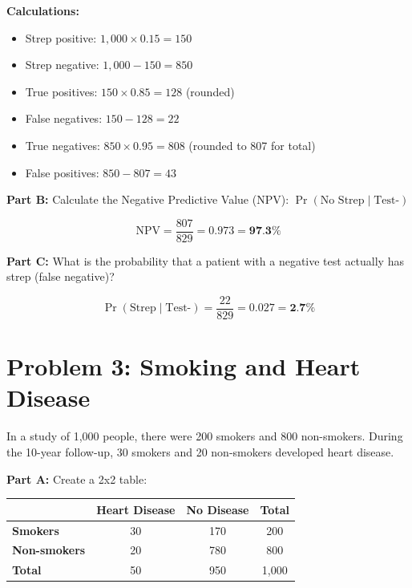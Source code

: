 \documentclass[11pt]{article}
\begin{document}
\textbf{Calculations:}
\begin{itemize}
\item Strep positive: $1,000 \times 0.15 = 150$
\item Strep negative: $1,000 - 150 = 850$
\item True positives: $150 \times 0.85 = 128$ (rounded)
\item False negatives: $150 - 128 = 22$
\item True negatives: $850 \times 0.95 = 808$ (rounded to 807 for total)
\item False positives: $850 - 807 = 43$
\end{itemize}

\vspace{12pt}

\textbf{Part B:} Calculate the Negative Predictive Value (NPV): $\Pr(\text{No Strep} \mid \text{Test-})$

$$\text{NPV} = \frac{807}{829} = 0.973 = \textbf{97.3\%}$$

\vspace{12pt}

\textbf{Part C:} What is the probability that a patient with a negative test actually has strep (false negative)?

$$\Pr(\text{Strep} \mid \text{Test-}) = \frac{22}{829} = 0.027 = \textbf{2.7\%}$$

\section{Problem 3: Smoking and Heart Disease}

In a study of 1,000 people, there were 200 smokers and 800 non-smokers. During the 10-year follow-up, 30 smokers and 20 non-smokers developed heart disease.

\vspace{12pt}

\textbf{Part A:} Create a 2x2 table:

\vspace{12pt}

\begin{center}
\begin{tabular}{|l|c|c|c|}
\hline
& \textbf{Heart Disease} & \textbf{No Disease} & \textbf{Total} \\
\hline
\textbf{Smokers} & 30 & 170 & 200 \\[2ex]
\hline
\textbf{Non-smokers} & 20 & 780 & 800 \\[2ex]
\hline
\textbf{Total} & 50 & 950 & 1,000 \\[2ex]
\hline
\end{tabular}
\end{center}
\end{document}
